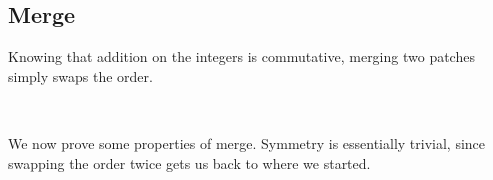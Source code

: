\subsection{Merge}

Knowing that addition on the integers is commutative, merging two patches simply swaps
the order.

\begin{code}%
\>[0]\AgdaSpace{}%
\AgdaSymbol{:}\AgdaSpace{}%
\AgdaSymbol{(}\AgdaSpace{}%
\AgdaSpace{}%
\AgdaSymbol{)}\AgdaSpace{}%
\AgdaSpace{}%
\AgdaSymbol{(}\AgdaSpace{}%
\AgdaSpace{}%
\AgdaSymbol{)}\<%
\\
\>[0]\AgdaSpace{}%
\AgdaSymbol{(}\AgdaSpace{}%
\AgdaOperator{\AgdaInductiveConstructor{,}}\AgdaSpace{}%
\AgdaSymbol{)}\AgdaSpace{}%
\AgdaSymbol{=}\AgdaSpace{}%
\AgdaSymbol{(}\AgdaSpace{}%
\AgdaOperator{\AgdaInductiveConstructor{,}}\AgdaSpace{}%
\AgdaSymbol{)}\<%
\end{code}

We now prove some properties of merge. Symmetry is essentially trivial, since swapping
the order twice gets us back to where we started.

\begin{code}%
\>[0]\AgdaSpace{}%
\AgdaSymbol{:}%
\>[85I]\AgdaSymbol{\{}\AgdaSpace{}%
\AgdaSpace{}%
\AgdaSpace{}%
\AgdaSpace{}%
\AgdaSpace{}%
\AgdaSymbol{:}\AgdaSpace{}%
\AgdaSpace{}%
\AgdaSymbol{\}}\<%
\\
\>[.][@{}l@{}]\<[85I]%
\>[12]\AgdaSpace{}%
\AgdaSpace{}%
\AgdaSymbol{(}\AgdaSpace{}%
\AgdaSpace{}%
\AgdaOperator{\AgdaInductiveConstructor{,}}\AgdaSpace{}%
\AgdaSpace{}%
\AgdaSymbol{)}\AgdaSpace{}%
\AgdaSpace{}%
\AgdaSymbol{(}\AgdaSpace{}%
\AgdaSpace{}%
\AgdaOperator{\AgdaInductiveConstructor{,}}\AgdaSpace{}%
\AgdaSpace{}%
\AgdaSymbol{)}\AgdaSpace{}%
\AgdaSpace{}%
\AgdaSpace{}%
\AgdaSymbol{(}\AgdaSpace{}%
\AgdaSpace{}%
\AgdaOperator{\AgdaInductiveConstructor{,}}\AgdaSpace{}%
\AgdaSpace{}%
\AgdaSymbol{)}\AgdaSpace{}%
\AgdaSpace{}%
\AgdaSymbol{(}\AgdaSpace{}%
\AgdaSpace{}%
\AgdaOperator{\AgdaInductiveConstructor{,}}\AgdaSpace{}%
\AgdaSpace{}%
\AgdaSymbol{)}\<%
\\
\>[0]\AgdaSpace{}%
\AgdaSpace{}%
\AgdaSymbol{=}\AgdaSpace{}%
\AgdaSpace{}%
\AgdaSpace{}%
\<%
\end{code}

